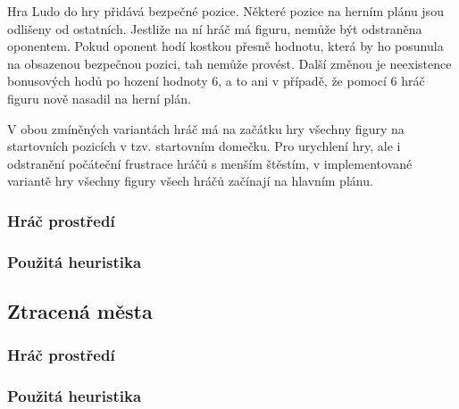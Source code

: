 Hra Ludo do hry přidává bezpečné pozice. Některé pozice na herním plánu jsou odlišeny od ostatních. Jestliže na ní hráč má figuru, nemůže být odstraněna oponentem. Pokud oponent hodí kostkou přesně hodnotu, která by ho posunula na obsazenou bezpečnou pozici, tah nemůže provést. Další změnou je neexistence bonusových hodů po hození hodnoty 6, a to ani v případě, že pomocí 6 hráč figuru nově nasadil na herní plán.

V obou zmíněných variantách hráč má na začátku hry všechny figury na startovních pozicích v tzv. startovním domečku. Pro urychlení hry, ale i odstranění počáteční frustrace hráčů s menším štěstím, v implementované variantě hry všechny figury všech hráčů začínají na hlavním plánu.

\subsubsection{Hráč prostředí}

\subsubsection{Použitá heuristika}

\subsection{Ztracená města}

\subsubsection{Hráč prostředí}

\subsubsection{Použitá heuristika}

\endinput
